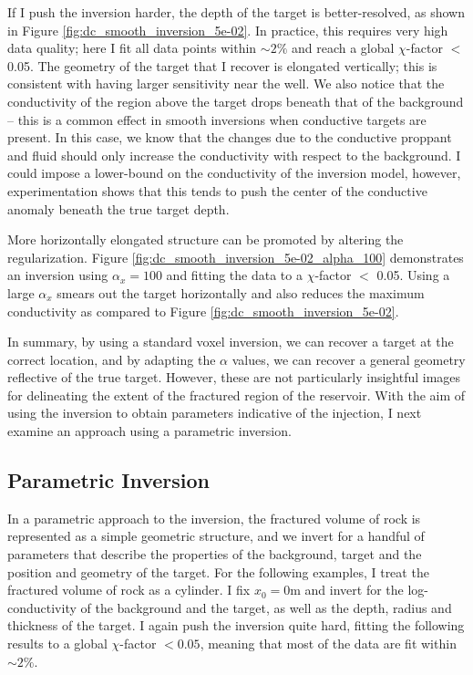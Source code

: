 






If I push the inversion harder, the depth of the target is better-resolved, as shown in Figure \ref{fig:dc_smooth_inversion_5e-02}. In practice, this requires very high data quality; here I fit all data points within $\sim2\%$ and reach a global $\chi$-factor $<$0.05. The geometry of the target that I recover is elongated vertically; this is consistent with having larger sensitivity near the well. We also notice that the conductivity of the region above the target drops beneath that of the background -- this is a common effect in smooth inversions when conductive targets are present. In this case, we know that the changes due to the conductive proppant and fluid should only increase the conductivity with respect to the background. I could impose a lower-bound on the conductivity of the inversion model, however, experimentation shows that this tends to push the center of the conductive anomaly beneath the true target depth.




More horizontally elongated structure can be promoted by altering the regularization. Figure \ref{fig:dc_smooth_inversion_5e-02_alpha_100} demonstrates an inversion using $\alpha_x=100$ and fitting the data to a $\chi$-factor $<$ 0.05. Using a large $\alpha_x$ smears out the target horizontally and also reduces the maximum conductivity as compared to Figure \ref{fig:dc_smooth_inversion_5e-02}.




In summary, by using a standard voxel inversion, we can recover a target at the correct location, and by adapting the $\alpha$ values, we can recover a general geometry reflective of the true target. However, these are not particularly insightful images for delineating the extent of the fractured region of the reservoir. With the aim of using the inversion to obtain parameters indicative of the injection, I next examine an approach using a parametric inversion.
\subsection{Parametric Inversion}
In a parametric approach to the inversion, the fractured volume of rock is represented as a simple geometric structure, and we invert for a handful of parameters that describe the properties of the background, target and the position and geometry of the target. For the following examples, I treat the fractured volume of rock as a cylinder. I fix $x_0 = 0$m and invert for the log-conductivity of the background and the target, as well as the depth, radius and thickness of the target. I again push the inversion quite hard, fitting the following results to a global $\chi$-factor $<0.05$, meaning that most of the data are fit within $\sim 2\%$.

